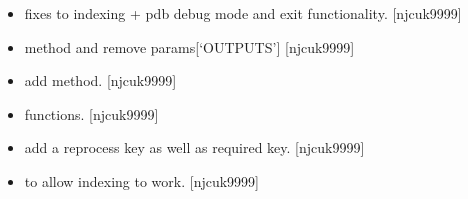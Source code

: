 \documentclass[a4paper,10pt,english]{report}
\begin{document}
\begin{itemize}
\item {} 
 \sphinxhyphen{} fixes to indexing + pdb debug mode and exit
functionality. {[}njcuk9999{]}

\item {} 
 \sphinxhyphen{}  method and remove
params{[}‘OUTPUTS’{]} {[}njcuk9999{]}

\item {} 
 \sphinxhyphen{} add  method. {[}njcuk9999{]}

\item {} 
 \sphinxhyphen{}  
functions. {[}njcuk9999{]}

\item {} 
 \sphinxhyphen{} add a reprocess key as well as required
key. {[}njcuk9999{]}

\item {} 
 \sphinxhyphen{}  to allow indexing to work.
{[}njcuk9999{]}

\end{itemize}
\end{document}

